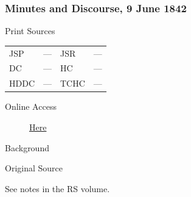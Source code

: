 		\subsubsection{Minutes and Discourse, 9 June 1842}
			\label{EMS-1842-JS-9-JUN-1842}
			
			\begin{description}
				\item[Print Sources]
			\end{description}

			\begin{tabular}{p{0.5in}p{1in}p{0.5in}p{1in}}
				JSP	 	& ---		& JSR 		& --- \\
				DC	 	& ---		& HC 		& --- \\
				HDDC 	& ---		& TCHC 		& --- \\
			\end{tabular}
			
			\begin{description}
				\item[Online Access] \href{https://www.josephsmithpapers.org/paper-summary/minutes-and-discourse-9-june-1842/1}{Here}
			\end{description}
			
			\begin{description}
				\item[Background]
			\end{description}
			
			
			\begin{description}
				\item[Original Source]
			\end{description}
			
				See notes in the RS volume.
			
			
